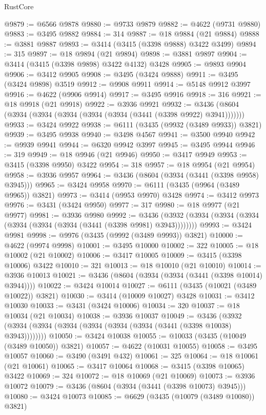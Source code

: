 \begin{lexlean}{RustCore}
\begin{coremodule}
@9879 := @6566 @9878
@9880 := @9733 @9879
@9882 := @4622 (@9731 @9880)
@9883 := @3495 @9882
@9884 := 314
@9887 := @18 @9884 (@21 @9884)
@9888 := @3881 @9887
@9893 := @3414 (@3415 (@3398 @9888) @3422 @3499)
@9894 := 315
@9897 := @18 @9894 (@21 @9894)
@9898 := @3881 @9897
@9904 := @3414 (@3415 (@3398 @9898) @3422 @4132) @3428
@9905 := @9893 @9904
@9906 := @3412 @9905
@9908 := @3495 (@3424 @9888)
@9911 := @3495 (@3424 @9898) @3519
@9912 := @9908 @9911
@9914 := @5148 @9912 @3997
@9916 := @4622 (@9906 @9914)
@9917 := @3495 @9916
@9918 := 316
@9921 := @18 @9918 (@21 @9918)
@9922 := @3936 @9921
@9932 := @3436 (@8604 (@3934 (@3934 (@3934 (@3934 (@3934 (@3441 (@3398 @9922) @3941)))))))
@9933 := @3424 @9922
@9938 := @6111 (@3435 (@9932 (@3489 @9933)) @3821)
@9939 := @3495 @9938
@9940 := @3498 @4567
@9941 := @3500 @9940
@9942 := @9939 @9941
@9944 := @6320 @9942 @3997
@9945 := @3495 @9944
@9946 := 319
@9949 := @18 @9946 (@21 @9946)
@9950 := @3417 @9949
@9953 := @3415 (@3398 @9950) @3422
@9954 := 318
@9957 := @18 @9954 (@21 @9954)
@9958 := @3936 @9957
@9964 := @3436 (@8604 (@3934 (@3441 (@3398 @9958) @3945)))
@9965 := @3424 @9958
@9970 := @6111 (@3435 (@9964 (@3489 @9965)) @3821)
@9973 := @3414 (@9953 @9970) @3428
@9974 := @3412 @9973
@9976 := @3431 (@3424 @9950)
@9977 := 317
@9980 := @18 @9977 (@21 @9977)
@9981 := @3936 @9980
@9992 := @3436 (@3932 (@3934 (@3934 (@3934 (@3934 (@3934 (@3934 (@3441 (@3398 @9981) @3943))))))))
@9993 := @3424 @9981
@9998 := @9976 (@3435 (@9992 (@3489 @9993)) @3821)
@10000 := @4622 (@9974 @9998)
@10001 := @3495 @10000
@10002 := 322
@10005 := @18 @10002 (@21 @10002)
@10006 := @3417 @10005
@10009 := @3415 (@3398 @10006) @3422
@10010 := 321
@10013 := @18 @10010 (@21 @10010)
@10014 := @3936 @10013
@10021 := @3436 (@8604 (@3934 (@3934 (@3441 (@3398 @10014) @3944))))
@10022 := @3424 @10014
@10027 := @6111 (@3435 (@10021 (@3489 @10022)) @3821)
@10030 := @3414 (@10009 @10027) @3428
@10031 := @3412 @10030
@10033 := @3431 (@3424 @10006)
@10034 := 320
@10037 := @18 @10034 (@21 @10034)
@10038 := @3936 @10037
@10049 := @3436 (@3932 (@3934 (@3934 (@3934 (@3934 (@3934 (@3934 (@3441 (@3398 @10038) @3943))))))))
@10050 := @3424 @10038
@10055 := @10033 (@3435 (@10049 (@3489 @10050)) @3821)
@10057 := @4622 (@10031 @10055)
@10058 := @3495 @10057
@10060 := @3490 (@3491 @432)
@10061 := 325
@10064 := @18 @10061 (@21 @10061)
@10065 := @3417 @10064
@10068 := @3415 (@3398 @10065) @3422
@10069 := 324
@10072 := @18 @10069 (@21 @10069)
@10073 := @3936 @10072
@10079 := @3436 (@8604 (@3934 (@3441 (@3398 @10073) @3945)))
@10080 := @3424 @10073
@10085 := @6629 (@3435 (@10079 (@3489 @10080)) @3821)

\end{coremodule}
\end{lexlean}
